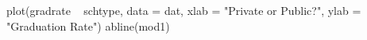 \begin{Schunk}
\begin{Sinput}
 plot(gradrate ~ schtype, data = dat, xlab = "Private or Public?", ylab = "Graduation Rate")
 abline(mod1)
\end{Sinput}
\end{Schunk}

